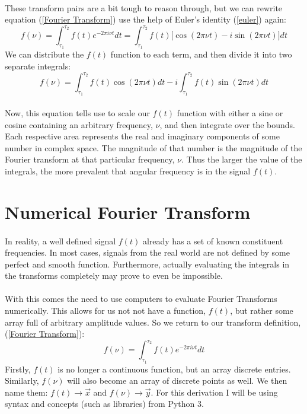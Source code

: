 \documentclass[12pt,letterpaper]{article}
\begin{document}
\paragraph*{}These transform pairs are a bit tough to reason through, but we can rewrite equation (\ref{Fourier Transform}) use the help of Euler's identity (\ref{euler}) again:
\begin{equation}
f(\nu) = 
\int_{\tau_1}^{\tau_2} f(t) e^{-2\pi i\nu t} dt =
\int_{\tau_1}^{\tau_2} f(t) \Big[\cos(2\pi\nu t) - i\sin(2\pi\nu t)\Big] dt
\end{equation}
We can distribute the $f(t)$ function to each term, and then divide it into two separate integrals:
\begin{equation}
f(\nu) = 
\int_{\tau_1}^{\tau_2} f(t)\cos(2\pi\nu t)dt -
i\int_{\tau_1}^{\tau_2} f(t)\sin(2\pi\nu t)dt
\end{equation}
\paragraph*{}Now, this equation tells use to scale our $f(t)$ function with either a sine or cosine containing an arbitrary frequency, $\nu$, and then integrate over the bounds. Each respective area represents the real and imaginary components of some number in complex space. The magnitude of that number is the magnitude of the Fourier transform at that particular frequency, $\nu$. Thus the larger the value of the integrals, the more prevalent that angular frequency is in the signal $f(t)$.


\section{Numerical Fourier Transform}
\paragraph*{}In reality, a well defined signal $f(t)$ already has a set of known 
constituent frequencies. In most cases, signals from the real world are not defined by some perfect and smooth function. Furthermore, actually evaluating the integrals in the transforms completely may prove to even be impossible. 
\paragraph*{}With this comes the need to use computers to evaluate Fourier Transforms numerically. This allows for us not not have a function, $f(t)$, but rather some array full of arbitrary amplitude values. So we return to our transform definition, (\ref{Fourier Transform}):
\begin{equation}
f(\nu) = \int_{\tau_1}^{\tau_2} f(t) e^{-2\pi i\nu t} dt
\end{equation}
Firstly, $f(t)$ is no longer a continuous function, but an array discrete entries. Similarly, $f(\nu)$ will also become an array of discrete points as well. We then name them: $f(t) \rightarrow \vec{x}$ and $f(\nu) \rightarrow \vec{y}$. For this derivation I will be using syntax and concepts (such as libraries) from Python 3. 
\end{document}
